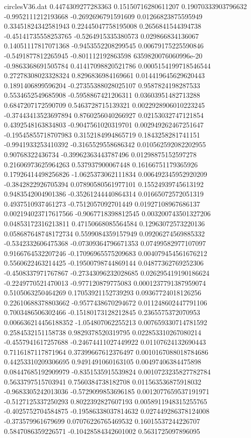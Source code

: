 \begin{filecontents}{circlesV36.dat}
0.4474309277283363	0.15150716280611207	0.19070333903796632
-0.9952111212193668	-0.2692696791591609	0.01266823875595949
0.33451824342581943	0.22445047758195008	0.2656841544394738
-0.45141735558253765	-0.5264915335380573	0.029866834136067
0.14051117817071368	-0.9453552208299545	0.00679175225590846
-0.5491877812265945	-0.801112192863598	6359820076060996e-20
-0.9863368691505784	0.41417098820521786	0.0005154199718546544
0.27278308023328324	0.8296836984169661	0.014419645629620443
0.1891406899596204	-0.27355388028025107	0.9587824198287533
0.5534652549685908	-0.5958867421206311	0.03603951482713288
0.6847207172590709	0.5463728715139321	0.0022928906010223245
-0.37443413523697894	0.8760256040266927	0.02153032747121854
0.4392548163834803	-0.9047561020319701	0.002949262467251647
-0.19545855718707983	0.3152184994865719	0.1843258281741151
-0.9941933253410392	-0.3165529558686342	0.010562592082202955
0.90768322436734	-0.39962363443787496	0.01298875152597278
0.21606973625964263	0.537937900067448	0.16166751179365926
0.17926414498256826	-1.0625373062111834	0.006492345952920209
-0.3842822926705394	0.07890580561977101	0.15524939745613192
0.9483542004901386	-0.35261244440864314	0.01665072572051319
0.4937510937461273	-0.7512057092701449	0.01927108967686137
0.002194023717617566	-0.9067718398812545	0.003200743501327206
0.04853172316213811	0.47150668085564584	0.12963072573220136
0.058687648748172734	0.5599084359157949	0.09206274569885332
-0.5342332606475368	-0.07309364796671353	0.07499582977107097
0.9166764532207246	-0.17096965575209683	0.004079454561676212
0.5560622463214425	-0.19500798744869144	0.04877362769252306
-0.4508337971767867	-0.27343096232028685	0.026295419190186624
-0.2249770521470013	-0.977120879775083	0.0001237791387959074
0.5105063250464269	0.17053921152739293	0.09367724018126256
0.22610688378803662	-0.9577438670294672	0.011248602447791106
0.7003486506302466	-0.15180173128212845	0.2365575372070953
0.006636214456188352	-1.054807062255213	0.007659330714781592
0.2584532151158738	0.9829378520319795	0.022853310267080214
-0.4557941617257688	-0.24674411027449922	0.01107624132690443
0.7116187117871964	0.37399667612376497	0.0010167088018784686
0.44253310209306695	0.9491491060163105	0.00497406384475898
0.08447685192909979	-0.8351535915539824	0.0010723235827782784
0.5633797515703941	0.7560384738182708	0.011563536875918032
-0.9683305242013036	-0.5729099853696185	0.0012077659537191971
-0.5127125337250293	0.8022392827607193	0.0058911948315255765
-0.4025752704584875	-0.19586338037814632	0.027449286378124008
-0.373579961679699	0.07076226765469532	0.16015537244226707
0.5847086359226571	-0.10428584342601002	0.5631725097896095

\end{filecontents}
